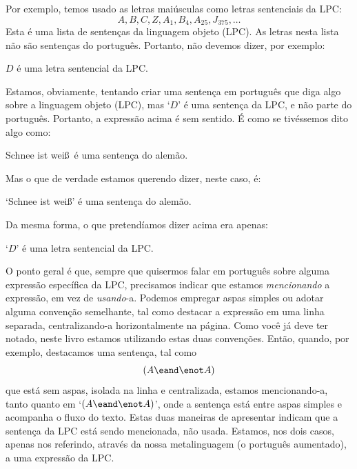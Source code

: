 Por exemplo, temos usado as letras maiúsculas como letras sentenciais da LPC:
	$$A, B, C, Z, A_1, B_4, A_{25}, J_{375},\ldots$$
Esta é uma lista de sentenças da linguagem objeto (LPC).
As letras nesta lista não são sentenças do português.
Portanto, não devemos dizer, por exemplo:
	\begin{ebullet}
		\item $D$ é uma letra sentencial da LPC.
	\end{ebullet}
Estamos, obviamente, tentando criar uma sentença em português que diga algo sobre a linguagem objeto (LPC), mas `$D$' é uma sentença da LPC, e não parte do português.
Portanto, a expressão acima é sem sentido.
É como se tivéssemos dito algo como:
	\begin{ebullet}
		\item Schnee ist wei\ss\ é uma sentença do alemão.
	\end{ebullet}
Mas o que de verdade estamos querendo dizer, neste caso, é:
	\begin{ebullet}
		\item `Schnee ist wei\ss' é uma sentença do alemão.
	\end{ebullet}
Da mesma forma, o que pretendíamos dizer acima era apenas:
	\begin{ebullet}
		\item `$D$' é uma letra sentencial da LPC.
	\end{ebullet}
O ponto geral é que, sempre que quisermos falar em português sobre alguma expressão específica da LPC, precisamos indicar que estamos \emph{mencionando} a expressão, em vez de \emph{usando}-a.
Podemos empregar aspas simples ou adotar alguma convenção semelhante, tal como destacar a expressão em uma linha separada, centralizando-a horizontalmente na página.
Como você já deve ter notado, neste livro estamos utilizando estas duas convenções.
Então, quando, por exemplo, destacamos uma sentença, tal como $$(A \eand \enot A)$$ que está sem aspas, isolada na linha e centralizada, estamos mencionando-a, tanto quanto em `$(A \eand \enot A)$', onde a sentença está entre aspas simples e acompanha o fluxo do texto.
Estas duas maneiras de apresentar indicam que a sentença da LPC está sendo mencionada, não usada.
Estamos, nos dois casos, apenas nos referindo, através da nossa metalinguagem (o português aumentado), a uma expressão da LPC.


